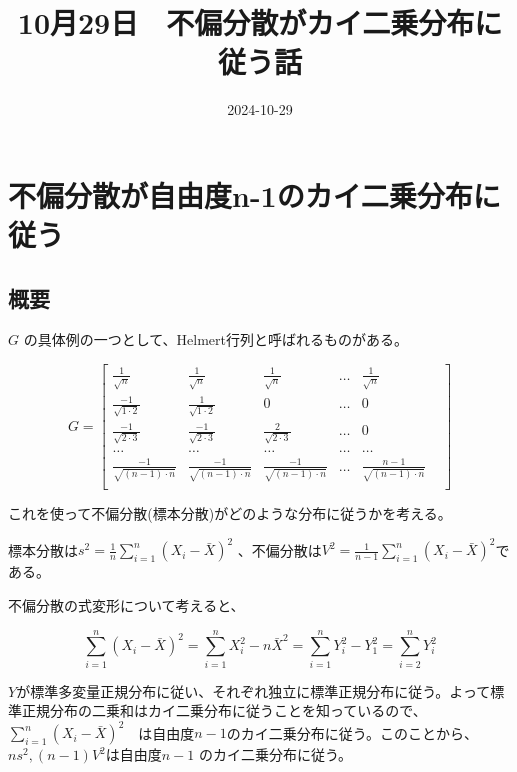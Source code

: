 \documentclass[
  letterpaper,
  DIV=11,
  numbers=noendperiod,
  oneside]{scrartcl}
\title{10月29日　不偏分散がカイ二乗分布に従う話}
\author{}
\date{2024-10-29}
\renewcommand*\contentsname{目次}
\newcommand\contentsname{目次}
\begin{document}
\maketitle

\renewcommand*\contentsname{目次}
{
\hypersetup{linkcolor=}
\setcounter{tocdepth}{3}
\tableofcontents
}

\section{不偏分散が自由度n-1のカイ二乗分布に従う}\label{ux4e0dux504fux5206ux6563ux304cux81eaux7531ux5ea6n-1ux306eux30abux30a4ux4e8cux4e57ux5206ux5e03ux306bux5f93ux3046}

\subsection{概要}\label{ux6982ux8981}

\(G\) の具体例の一つとして、Helmert行列と呼ばれるものがある。

\[
G=
\begin{bmatrix}
  \frac{1}{\sqrt{n}} & \frac{1}{\sqrt{n}} &\frac{1}{\sqrt{n}} &\dots &\frac{1}{\sqrt{n}}\\
   \frac{-1}{\sqrt{1 \cdot 2}} & \frac{1}{\sqrt{1 \cdot 2}}& 0 & \dots & 0\\
\frac{-1}{\sqrt{2 \cdot 3}} & \frac{-1}{\sqrt{2 \cdot 3}}& \frac{2}{\sqrt{2 \cdot 3}}& \dots & 0\\
\dots &\dots&\dots& \dots &\dots\\
\frac{-1}{\sqrt{(n-1) \cdot n}}& \frac{-1}{\sqrt{(n-1) \cdot n}}& 
\frac{-1}{\sqrt{(n-1) \cdot n}}& \dots & \frac{n-1}{\sqrt{(n-1) \cdot n}}& \\
\end{bmatrix}
\]

これを使って不偏分散(標本分散)がどのような分布に従うかを考える。

標本分散は\(s^2 = \frac{1}{n}\sum_{i=1}^n (X_i-\bar{X})^2\)
、不偏分散は\(V^2 =\frac{1}{n-1}\sum_{i=1}^n (X_i-\bar{X})^2\)である。

不偏分散の式変形について考えると、

\[
\sum_{i=1}^n (X_i-\bar{X})^2 = \sum_{i=1}^n X_i^2-n\bar{X}^2=\sum_{i=1}^n Y_i^2-Y_1^2=\sum_{i=2}^n Y_i^2
\]

\(Y\)が標準多変量正規分布に従い、それぞれ独立に標準正規分布に従う。よって標準正規分布の二乗和はカイ二乗分布に従うことを知っているので、\(\sum_{i=1}^n (X_i-\bar{X})^2\)　は自由度\(n-1\)のカイ二乗分布に従う。このことから、\(ns^2,(n-1)V^2\)は自由度\(n-1\)
のカイ二乗分布に従う。
\end{document}

